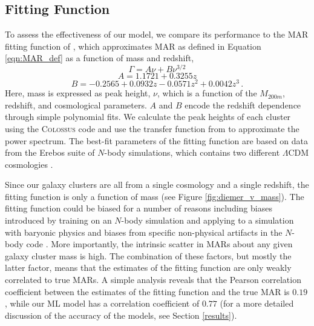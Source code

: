 \documentclass[twocolumn, linenumbers, 11pt]{aastex63}%
\begin{document}
\subsection{Fitting Function}\label{Diemer_2020}
To assess the effectiveness of our model, we compare its performance to the MAR fitting function of \citet{Diemer_2020}, which approximates MAR as defined in Equation \ref{eqn:MAR_def} as a function of mass and redshift,
\begin{equation}\label{eqn:Diemer_2020}
    \Gamma  = A\nu + B\nu^{3/2}
\end{equation}
\begin{equation}\label{eqn:Diemer_2020_A}
    A = 1.1721 + 0.3255z
\end{equation}
\begin{equation}\label{eqn:Diemer_2020_B}
    B  = -0.2565 + 0.0932z - 0.0571z^2 + 0.0042z^3 \,.
\end{equation}
Here, mass is expressed as peak height, $\nu$, which is a function of the $M_{200m}$, redshift, and cosmological parameters. $A$ and $B$ encode the redshift dependence through simple polynomial fits. We calculate the peak heights of each cluster using the \textsc{Colossus} code \citep{Diemer_2018} and use the transfer function from \citet{Eisenstein_1998} to approximate the power spectrum. The best-fit parameters of the fitting function are based on data from the Erebos suite of $N$-body simulations, which contains two different $\Lambda$CDM cosmologies \citep{Diemer_2020}. 

Since our galaxy clusters are all from a single cosmology and a single redshift, the fitting function is only a function of mass (see Figure \ref{fig:diemer_v_mass}). The fitting function could be biased for a number of reasons including biases introduced by training on an $N$-body simulation and applying to a simulation with baryonic physics and biases from specific non-physical artifacts in the $N$-body code \citep[for a discussion of the robustness of MARs in $N$-body simulations see][]{Soltis_2024}. More importantly, the intrinsic scatter in MARs about any given galaxy cluster mass is high. The combination of these factors, but mostly the latter factor, means that the estimates of the fitting function are only weakly correlated to true MARs. A simple analysis reveals that the Pearson correlation coefficient \citep{Pearson_1895} between the estimates of the fitting function and the true MAR is $0.19$, while our ML model has a correlation coefficient of $0.77$ (for a more detailed discussion of the accuracy of the models, see Section \ref{results}).
\end{document}
